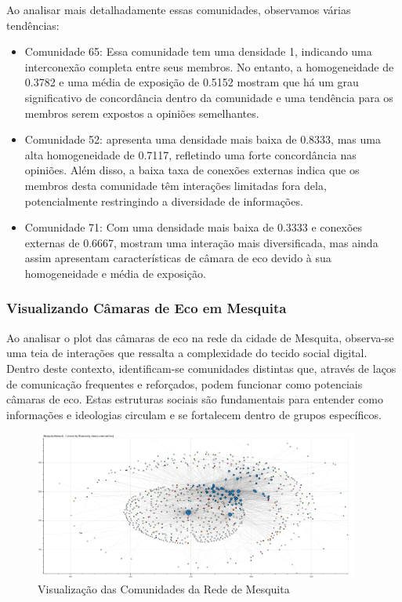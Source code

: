 Ao analisar mais detalhadamente essas comunidades, observamos várias tendências:

\begin{itemize}
	\item Comunidade 65: Essa comunidade tem uma densidade 1, indicando uma interconexão completa entre seus membros. No entanto, a homogeneidade de 0.3782 e uma média de exposição de 0.5152 mostram que há um grau significativo de concordância dentro da comunidade e uma tendência para os membros serem expostos a opiniões semelhantes.
	\item Comunidade 52: apresenta uma densidade mais baixa de 0.8333, mas uma alta homogeneidade de 0.7117, refletindo uma forte concordância nas opiniões. Além disso, a baixa taxa de conexões externas indica que os membros desta comunidade têm interações limitadas fora dela, potencialmente restringindo a diversidade de informações.
	\item Comunidade 71: Com uma densidade mais baixa de 0.3333 e conexões externas de 0.6667, mostram uma interação mais diversificada, mas ainda assim apresentam características de câmara de eco devido à sua homogeneidade e média de exposição.
\end{itemize}

\subsubsection*{Visualizando Câmaras de Eco em Mesquita}

Ao analisar o plot das câmaras de eco na rede da cidade de Mesquita, observa-se uma teia de interações que ressalta a complexidade do tecido social digital. Dentro deste contexto, identificam-se comunidades distintas que, através de laços de comunicação frequentes e reforçados, podem funcionar como potenciais câmaras de eco. Estas estruturas sociais são fundamentais para entender como informações e ideologias circulam e se fortalecem dentro de grupos específicos.

\begin{figure}[htb]
	\centering
	\includegraphics[width=0.95\textwidth]{images/network_communities_mesquita.png}
	\caption{Visualização das Comunidades da Rede de Mesquita}
	\label{fig:network_communities_mesquita}
\end{figure}


